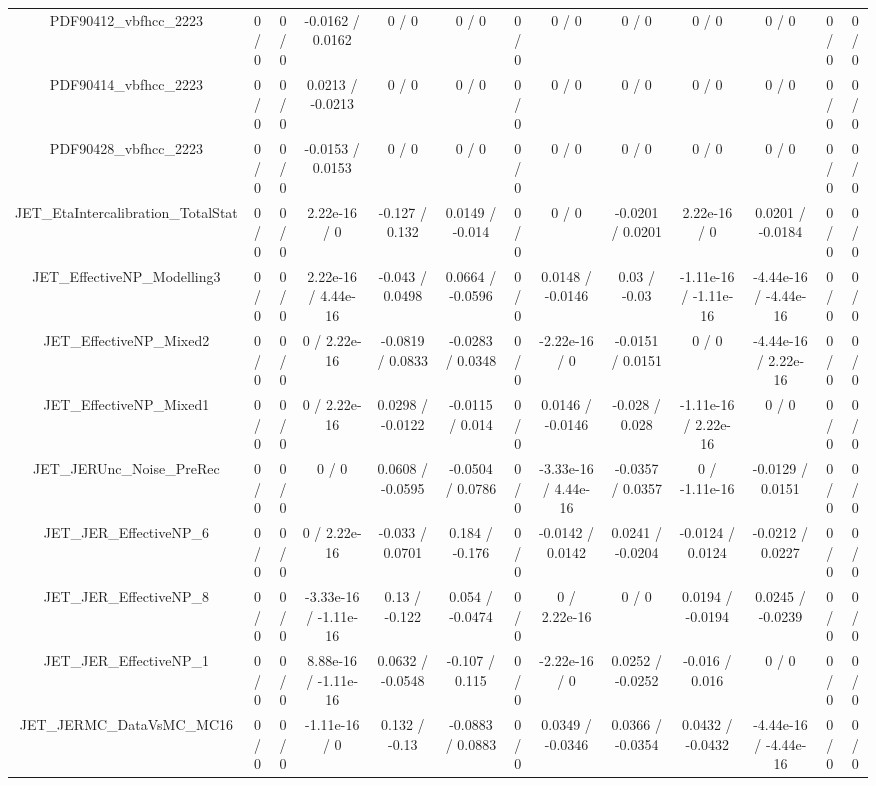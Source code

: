 \documentclass[10pt]{article}
\begin{document}
\begin{table}[htbp]
\begin{center}
\begin{tabular}{|c|c|c|c|c|c|c|c|c|c|c|c|c|}
  PDF90412_vbfhcc_2223 & 0 / 0 & 0 / 0 & -0.0162 / 0.0162 & 0 / 0 & 0 / 0 & 0 / 0 & 0 / 0 & 0 / 0 & 0 / 0 & 0 / 0 & 0 / 0 & 0 / 0 \\ 
  PDF90414_vbfhcc_2223 & 0 / 0 & 0 / 0 & 0.0213 / -0.0213 & 0 / 0 & 0 / 0 & 0 / 0 & 0 / 0 & 0 / 0 & 0 / 0 & 0 / 0 & 0 / 0 & 0 / 0 \\ 
  PDF90428_vbfhcc_2223 & 0 / 0 & 0 / 0 & -0.0153 / 0.0153 & 0 / 0 & 0 / 0 & 0 / 0 & 0 / 0 & 0 / 0 & 0 / 0 & 0 / 0 & 0 / 0 & 0 / 0 \\ 
  JET_EtaIntercalibration_TotalStat & 0 / 0 & 0 / 0 & 2.22e-16 / 0 & -0.127 / 0.132 & 0.0149 / -0.014 & 0 / 0 & 0 / 0 & -0.0201 / 0.0201 & 2.22e-16 / 0 & 0.0201 / -0.0184 & 0 / 0 & 0 / 0 \\ 
  JET_EffectiveNP_Modelling3 & 0 / 0 & 0 / 0 & 2.22e-16 / 4.44e-16 & -0.043 / 0.0498 & 0.0664 / -0.0596 & 0 / 0 & 0.0148 / -0.0146 & 0.03 / -0.03 & -1.11e-16 / -1.11e-16 & -4.44e-16 / -4.44e-16 & 0 / 0 & 0 / 0 \\ 
  JET_EffectiveNP_Mixed2 & 0 / 0 & 0 / 0 & 0 / 2.22e-16 & -0.0819 / 0.0833 & -0.0283 / 0.0348 & 0 / 0 & -2.22e-16 / 0 & -0.0151 / 0.0151 & 0 / 0 & -4.44e-16 / 2.22e-16 & 0 / 0 & 0 / 0 \\ 
  JET_EffectiveNP_Mixed1 & 0 / 0 & 0 / 0 & 0 / 2.22e-16 & 0.0298 / -0.0122 & -0.0115 / 0.014 & 0 / 0 & 0.0146 / -0.0146 & -0.028 / 0.028 & -1.11e-16 / 2.22e-16 & 0 / 0 & 0 / 0 & 0 / 0 \\ 
  JET_JERUnc_Noise_PreRec & 0 / 0 & 0 / 0 & 0 / 0 & 0.0608 / -0.0595 & -0.0504 / 0.0786 & 0 / 0 & -3.33e-16 / 4.44e-16 & -0.0357 / 0.0357 & 0 / -1.11e-16 & -0.0129 / 0.0151 & 0 / 0 & 0 / 0 \\ 
  JET_JER_EffectiveNP_6 & 0 / 0 & 0 / 0 & 0 / 2.22e-16 & -0.033 / 0.0701 & 0.184 / -0.176 & 0 / 0 & -0.0142 / 0.0142 & 0.0241 / -0.0204 & -0.0124 / 0.0124 & -0.0212 / 0.0227 & 0 / 0 & 0 / 0 \\ 
  JET_JER_EffectiveNP_8 & 0 / 0 & 0 / 0 & -3.33e-16 / -1.11e-16 & 0.13 / -0.122 & 0.054 / -0.0474 & 0 / 0 & 0 / 2.22e-16 & 0 / 0 & 0.0194 / -0.0194 & 0.0245 / -0.0239 & 0 / 0 & 0 / 0 \\ 
  JET_JER_EffectiveNP_1 & 0 / 0 & 0 / 0 & 8.88e-16 / -1.11e-16 & 0.0632 / -0.0548 & -0.107 / 0.115 & 0 / 0 & -2.22e-16 / 0 & 0.0252 / -0.0252 & -0.016 / 0.016 & 0 / 0 & 0 / 0 & 0 / 0 \\ 
  JET_JERMC_DataVsMC_MC16 & 0 / 0 & 0 / 0 & -1.11e-16 / 0 & 0.132 / -0.13 & -0.0883 / 0.0883 & 0 / 0 & 0.0349 / -0.0346 & 0.0366 / -0.0354 & 0.0432 / -0.0432 & -4.44e-16 / -4.44e-16 & 0 / 0 & 0 / 0 \\ 

\end{tabular}
\end{center}
\end{table}
\end{document}
